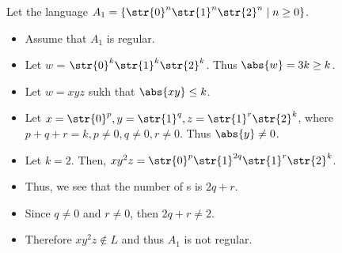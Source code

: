 Let the language $A_1 = \{\str{0}^n\str{1}^n\str{2}^n \mid n \geq 0\}$.
\begin{itemize}
	\item Assume that $A_1$ is regular.
	\item Let $w$ = $\str{0}^k\str{1}^k\str{2}^k$. Thus $\abs{w} = 3k \geq k$.
	\item Let $w = xyz$ sukh that $\abs{xy} \leq k$.
	\item Let $x = \str{0}^p, y = \str{1}^q, z = \str{1}^r\str{2}^k$, where $p+q+r = k, p \neq 0, q \neq 0, r \neq 0$. Thus $\abs{y} \neq 0$.
	\item Let $k=2$. Then, $xy^2z = \str{0}^p\str{1}^{2q}\str{1}^r\str{2}^k$.
	\item Thus, we see that the number of s is $2q + r$.
	\item Since $q \neq 0$ and $r \neq 0$, then $2q + r \neq 2$.
	\item Therefore $xy^2z \notin L$ and thus $A_1$ is not regular.
\end{itemize}